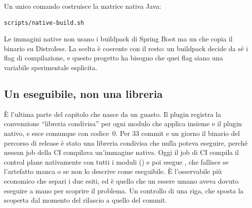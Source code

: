 Un unico comando costruisce la matrice nativa Java:

\begin{lstlisting}[language=bash]
scripts/native-build.sh
\end{lstlisting}

Le immagini native non usano i buildpack di Spring Boot ma un
 che copia il binario su Distroless. La scelta \`e coerente con
il resto: un buildpack decide da s\'e i flag di compilazione, e questo progetto
ha bisogno che quei flag siano una variabile sperimentale esplicita.

\subsection{Un eseguibile, non una libreria}

\`E l'ultima parte del capitolo che nasce da un guasto. Il plugin
 registra la convenzione ``libreria condivisa'' per ogni
modulo che applica insieme  e il plugin nativo, e
 esce comunque con codice~0. Per 33 commit e un giorno il
binario del percorso di release \`e stato una libreria condivisa che nulla poteva
eseguire, perch\'e nessun job della CI compilava un'immagine nativa. Oggi il job
di CI compila il control plane nativamente con tutti i moduli
() e poi esegue
, che fallisce se l'artefatto manca o
se  non lo descrive come eseguibile. \`E l'osservabile pi\`u economico
che separi i due esiti, ed \`e quello che un essere umano aveva dovuto eseguire a
mano per scoprire il problema. Un controllo di una riga, che sposta la scoperta
dal momento del rilascio a quello del commit.
